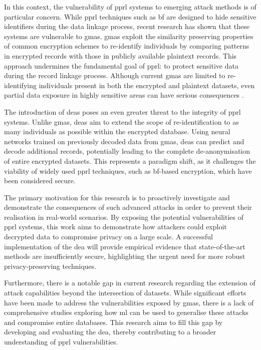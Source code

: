 In this context, the vulnerability of \ac{pprl} systems to emerging attack methods is of particular concern. 
While \ac{pprl} techniques such as \ac{bf} are designed to hide sensitive identifiers during the data linkage process, recent research has shown that these systems are vulnerable to \ac{gma}s. 
\ac{gma}s exploit the similarity preserving properties of common encryption schemes to re-identify individuals by comparing patterns in encrypted records with those in publicly available plaintext records. 
This approach undermines the fundamental goal of \ac{pprl}: to protect sensitive data during the record linkage process. 
Although current \ac{gma}s are limited to re-identifying individuals present in both the encrypted and plaintext datasets, even partial data exposure in highly sensitive areas can have serious consequences \cite{schaefer2024,vidanage2020graph}.

The introduction of \ac{dea}s poses an even greater threat to the integrity of \ac{pprl} systems. 
Unlike \ac{gma}s, \ac{dea}s aim to extend the scope of re-identification to as many individuals as possible within the encrypted database. 
Using neural networks trained on previously decoded data from \ac{gma}s, \ac{dea}s can predict and decode additional records, potentially leading to the complete de-anonymisation of entire encrypted datasets. 
This represents a paradigm shift, as it challenges the viability of widely used \ac{pprl} techniques, such as \ac{bf}-based encryption, which have been considered secure.

The primary motivation for this research is to proactively investigate and demonstrate the consequences of such advanced attacks in order to prevent their realisation in real-world scenarios. 
By exposing the potential vulnerabilities of \ac{pprl} systems, this work aims to demonstrate how attackers could exploit decrypted data to compromise privacy on a large scale. 
A successful implementation of the \ac{dea} will provide empirical evidence that state-of-the-art methods are insufficiently secure, highlighting the urgent need for more robust privacy-preserving techniques.

Furthermore, there is a notable gap in current research regarding the extension of attack capabilities beyond the intersection of datasets. 
While significant efforts have been made to address the vulnerabilities exposed by \ac{gma}s, there is a lack of comprehensive studies exploring how \ac{ml} can be used to generalise these attacks and compromise entire databases. 
This research aims to fill this gap by developing and evaluating the \ac{dea}, thereby contributing to a broader understanding of \ac{pprl} vulnerabilities.


